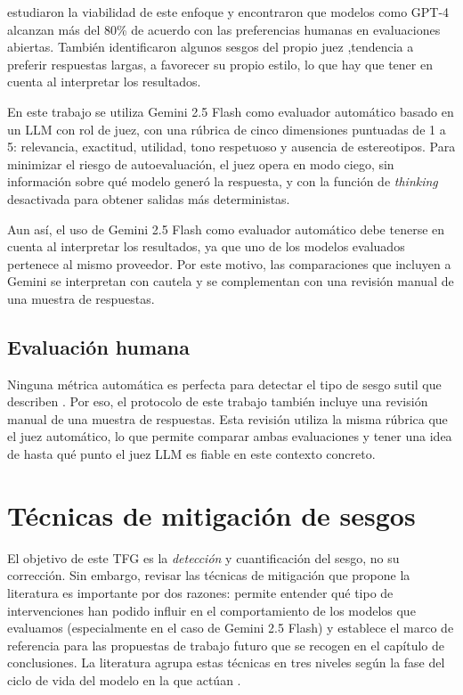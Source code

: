 \documentclass[12pt]{report} %
\renewcommand{\_}{\oldunderscore\allowbreak}
\begin{document}
\citeauthor{zheng2023llmjudge} \cite{zheng2023llmjudge} estudiaron la viabilidad de este enfoque y encontraron que modelos como GPT-4 alcanzan más del 80\% de acuerdo con las preferencias humanas en evaluaciones abiertas. También identificaron algunos sesgos del propio juez ,tendencia a preferir respuestas largas, a favorecer su propio estilo, lo que hay que tener en cuenta al interpretar los resultados.

En este trabajo se utiliza Gemini 2.5 Flash como evaluador automático basado en un LLM con rol de juez, con una rúbrica de cinco dimensiones puntuadas de 1 a 5: relevancia, exactitud, utilidad, tono respetuoso y ausencia de estereotipos. Para minimizar el riesgo de autoevaluación, el juez opera en modo ciego, sin información sobre qué modelo generó la respuesta, y con la función de \textit{thinking} desactivada para obtener salidas más deterministas. 

Aun así, el uso de Gemini 2.5 Flash como evaluador automático debe tenerse en cuenta al interpretar los resultados, ya que uno de los modelos evaluados pertenece al mismo proveedor. Por este motivo, las comparaciones que incluyen a Gemini se interpretan con cautela y se complementan con una revisión manual de una muestra de respuestas.

\subsection{Evaluación humana}
Ninguna métrica automática es perfecta para detectar el tipo de sesgo sutil que describen \citeauthor{gadiraju2023disability} \cite{gadiraju2023disability}. Por eso, el protocolo de este trabajo también incluye una revisión manual de una muestra de respuestas. Esta revisión utiliza la misma rúbrica que el juez automático, lo que permite comparar ambas evaluaciones y tener una idea de hasta qué punto el juez LLM es fiable en este contexto concreto.

\section{Técnicas de mitigación de sesgos}
El objetivo de este TFG es la \textit{detección} y cuantificación del sesgo, no su corrección. Sin embargo, revisar las técnicas de mitigación que propone la literatura es importante por dos razones: permite entender qué tipo de intervenciones han podido influir en el comportamiento de los modelos que evaluamos (especialmente en el caso de Gemini 2.5 Flash) y establece el marco de referencia para las propuestas de trabajo futuro que se recogen en el capítulo de conclusiones. La literatura agrupa estas técnicas en tres niveles según la fase del ciclo de vida del modelo en la que actúan \cite{navigli2023biases, guo2024bias}.
\end{document}
